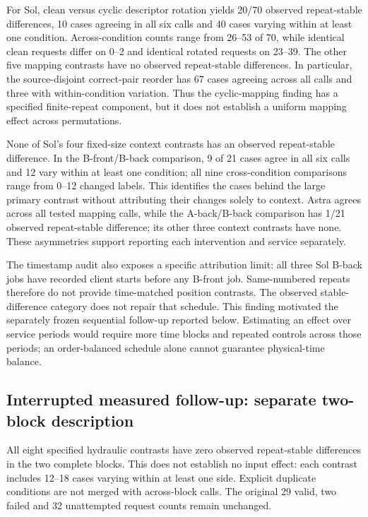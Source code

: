 \documentclass[11pt,a4paper]{article}
\begin{document}
For Sol, clean versus cyclic descriptor rotation yields 20/70 observed repeat-stable differences, 10 cases agreeing in all six calls and 40 cases varying within at least one condition. Across-condition counts range from 26--53 of 70, while identical clean requests differ on 0--2 and identical rotated requests on 23--39. The other five mapping contrasts have no observed repeat-stable differences. In particular, the source-disjoint correct-pair reorder has 67 cases agreeing across all calls and three with within-condition variation. Thus the cyclic-mapping finding has a specified finite-repeat component, but it does not establish a uniform mapping effect across permutations.

None of Sol's four fixed-size context contrasts has an observed repeat-stable difference. In the B-front/B-back comparison, 9 of 21 cases agree in all six calls and 12 vary within at least one condition; all nine cross-condition comparisons range from 0--12 changed labels. This identifies the cases behind the large primary contrast without attributing their changes solely to context. Astra agrees across all tested mapping calls, while the A-back/B-back comparison has 1/21 observed repeat-stable difference; its other three context contrasts have none. These asymmetries support reporting each intervention and service separately.

The timestamp audit also exposes a specific attribution limit: all three Sol B-back jobs have recorded client starts before any B-front job. Same-numbered repeats therefore do not provide time-matched position contrasts. The observed stable-difference category does not repair that schedule. This finding motivated the separately frozen sequential follow-up reported below. Estimating an effect over service periods would require more time blocks and repeated controls across those periods; an order-balanced schedule alone cannot guarantee physical-time balance.

\subsection{Interrupted measured follow-up: separate two-block description}
All eight specified hydraulic contrasts have zero observed repeat-stable differences in the two complete blocks. This does not establish no input effect: each contrast includes 12--18 cases varying within at least one side. Explicit duplicate conditions are not merged with across-block calls. The original 29 valid, two failed and 32 unattempted request counts remain unchanged.
\end{document}
